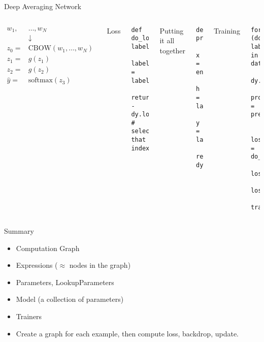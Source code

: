 \documentclass[compress]{beamer}
\begin{document}
\begin{frame}[fragile]{Deep Averaging Network}

\begin{columns}

  \begin{align*}
    w_1, &\dots, w_N \\
    & \downarrow \\
    z_0 = & \mbox{CBOW}(w_1, \dots, w_N) \\
    z_1 = & g(z_1) \\
    z_2 = & g(z_2) \\
    \hat y = & \mbox{softmax}(z_3)
  \end{align*}


\alert<1>{Loss}
\begin{verbatim}
def do_loss(probs, label):
    label = label_indicator[label]
    return -dy.log(dy.pick(probs,label)) # select that index
\end{verbatim}

\alert<2>{Putting it all together}
\begin{verbatim}
def predict_labels(doc):
    x = encode_doc(doc)
    h = layer1(x)
    y = layer2(h)
    return dy.softmax(y)
\end{verbatim}

\alert<3>{Training}
\begin{verbatim}
for (doc, label) in data:
    dy.renew_cg()
    probs = predict_labels(doc)

    loss = do_loss(probs,label)
    loss.forward()
    loss.backward()
    trainer.update()
\end{verbatim}

\end{columns}
\end{frame}


\begin{frame}{Summary}

\begin{itemize}
  \item Computation Graph
  \item Expressions ($\approx$ nodes in the graph)
  \item Parameters, LookupParameters
  \item Model (a collection of parameters)
  \item Trainers
  \item Create a graph for each example, then compute loss, backdrop, update.
\end{itemize}

\end{frame}
\end{document}
